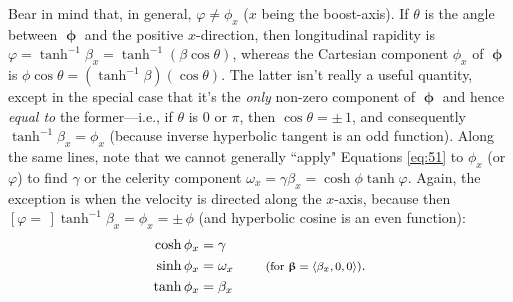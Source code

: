 \documentclass[12pt]{article}
\newcommand{\vvbeta}{\bm{\upbeta}}
\newcommand{\vvphi}{\bm{\upphi}}
\begin{document}
Bear in mind that, in general, $\varphi \neq \phi_x$ ($x$ being the boost-axis). If $\theta$ is the angle between $\vvphi$ and the positive $x$-direction, then longitudinal rapidity is $\varphi = \tanh^{-1} \beta_x = \tanh^{-1}{(\beta \cos{\theta})}$, whereas the Cartesian component $\phi_x$ of $\vvphi$ is $\phi \cos{\theta} = (\tanh^{-1}{\beta}) (\cos{\theta})$. The latter isn't really a useful quantity, except in the special case that it's the \emph{only} non-zero component of $\vvphi$ and hence \emph{equal to} the former---i.e., if $\theta$ is $0$ or $\pi$, then $\cos{\theta} = \pm \, 1$, and consequently $\tanh^{-1} \beta_x = \phi_x$ (because inverse hyperbolic tangent is an odd function). Along the same lines, note that we cannot generally ``apply" Equations \ref{eq:51} to $\phi_x$ (or $\varphi$) to find $\gamma$ or the celerity component $\omega_x = \gamma \beta_x = \cosh{\phi} \tanh{\varphi}$. Again, the exception is when the velocity is directed along the $x$-axis, because then $[\varphi = \, ] \tanh^{-1} \beta_x = \phi_x = \pm \, \phi$ (and hyperbolic cosine is an even function):
\begin{equation}\label{eq:rx}
\begin{aligned}
\cosh{\phi _x} &= \gamma \\
\sinh{\phi_x} &= \omega_x \qquad \textrm{\footnotesize{ (for $\vvbeta = \langle \beta_x, 0, 0 \rangle $)}} .\\
\tanh{\phi_x} &= \beta_x
\end{aligned}
\end{equation}
\end{document}
